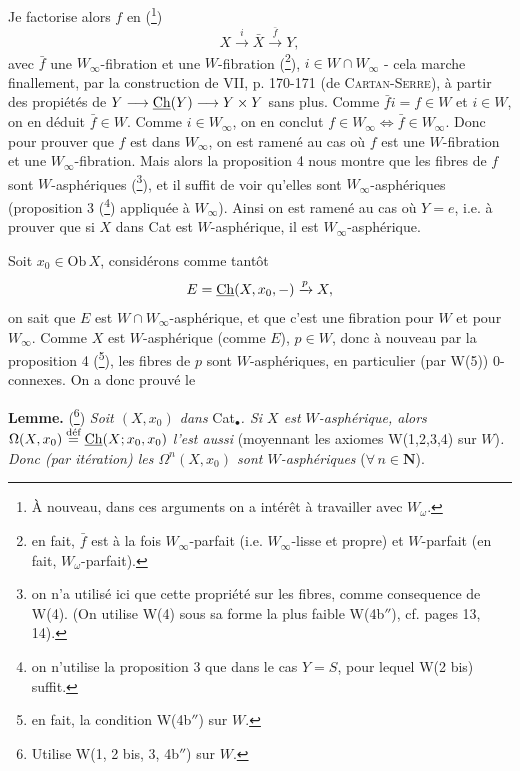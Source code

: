 Je factorise alors $f$ en (\footnote[19]{À nouveau, dans ces arguments on a intérêt à travailler avec $W_\omega$.})
\[ X \xrightarrow{i} \bar{X} \xrightarrow{\bar{f}} Y, \]
avec $\bar{f}$ une $W_\infty$-fibration et une $W$-fibration (\footnote[20]{en fait, $\bar{f}$ est à la fois $W_\infty$-parfait (i.e. $W_\infty$-lisse et propre) et $W$-parfait (en fait, $W_\omega$-parfait).}), $i \in W \cap W_\infty$ - cela marche finallement, %
par la construction de VII, p. 170-171 (de \textsc{Cartan-Serre}), à partir des propiétés de %
$Y \longrightarrow \underline{\mathrm{Ch}}(Y) \longrightarrow Y \times Y$ sans plus. Comme $\bar{f} i = f \in W$ et $i \in W$, on en déduit $\bar{f} \in W$. Comme $i \in W_\infty$, on en conclut $f \in W_\infty \iff \bar{f} \in W_\infty$. Donc pour prouver que $f$ est dans $W_\infty$, on est ramené au cas où $f$ est une $W$-fibration et une $W_\infty$-fibration. Mais alors la proposition 4 nous montre que les fibres de $f$ sont $W$-asphériques (\footnote[21]{on n'a utilisé ici que cette propriété sur les fibres, comme consequence de W(4). (On utilise W(4) sous sa forme la plus faible W(4b$''$), cf. pages 13, 14).}), et il suffit de voir qu'elles sont $W_\infty$-asphériques (proposition 3 (\footnote[22]{on n'utilise la proposition 3 que dans le cas $Y = S$, pour lequel W(2 bis) suffit.}) appliquée à $W_\infty$). Ainsi on est ramené au cas où $Y = e$, i.e. à prouver que si $X$ dans Cat est $W$-asphérique, il est $W_\infty$-asphérique.

Soit $x_0 \in \mathrm{Ob}\, X$, considérons comme tantôt
\[ E = \underline{\mathrm{Ch}}(X, x_0, -) \xrightarrow{p} X, \]
on sait que $E$ est $W \cap W_\infty$-asphérique, et que c'est une fibration pour $W$ et pour $W_\infty$. Comme $X$ est $W$-asphérique (comme $E$), $p \in W$, donc à nouveau par la proposition 4 (\footnote[23]{en fait, la condition W(4b$''$) sur $W$.}), les fibres de $p$ sont $W$-asphériques, en particulier (par W(5)) 0-connexes. On a donc prouvé le

\textbf{Lemme.} (\footnote[24]{Utilise W(1, 2 bis, 3, 4b$''$) sur $W$.}) \textit{Soit $(X, x_0)$ dans} Cat$_\bullet$\textit{. Si $X$ est $W$-asphérique, alors $\Omega(X, x_0) \overset{\text{déf}}{=} \underline{\mathrm{Ch}}(X; x_0, x_0)$ l'est aussi} (moyennant les axiomes W(1,2,3,4) sur $W$)\textit{. Donc (par itération) les $\Omega^n(X, x_0)$ sont $W$-asphériques} ($\forall\, n \in \mathbf{N}$).

